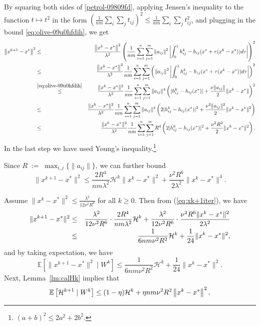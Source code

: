 \documentclass[10pt]{article}
\newcommand{\eqdef}{\; { := }\;}
\newcommand{\ExpBr}[1]{\mathbb{E}\left[#1\right]}
\newcommand{\norm}[1]{\left\|#1\right\|}
\newcommand{\cH}{{\mathcal{H}}}
\begin{document}
By squaring both sides of \eqref{petrol-09809fd},  applying Jensen's inequality to the function $t\mapsto t^2$ in the form $\left(\frac{1}{nm}\sum_i \sum_j t_{ij}\right)^2 \leq \frac{1}{nm}\sum_i \sum_j t^2_{ij}$, and plugging in the bound \eqref{eq:olive-09u0hfdih}, we get
\begin{eqnarray*}	
\norm{ x^{k+1} - x^* }^2	&\overset{}\leq &  \frac{ \norm{x^k - x^*}^2}{ \lambda^2} \left(\frac{1}{nm} \sum_{i=1}^n \sum_{j=1}^{m} \norm{a_{ij}}^2 \left|   \int_{0}^1 h_{ij}^k - h_{ij}(x^* + \tau(x^k - x^*))  d\tau  \right| \right)^2 \\
&\leq &\frac{ \norm{x^k - x^*}^2}{ \lambda^2} \frac{1}{nm} \sum_{i=1}^n \sum_{j=1}^{m} \left( \norm{a_{ij}}^2  \left| \int_{0}^1 h_{ij}^k - h_{ij}(x^* + \tau(x^k - x^*))  d\tau  \right|\right)^2 \\
&\overset{\eqref{eq:olive-09u0hfdih}}{\leq}&  \frac{\|x^k-x^*\|^2}{ \lambda^2} \frac{1}{nm}\sum_{i=1}^n \sum_{j=1}^{m} \|a_{ij}\|^4 \left(   |h_{ij}^k - h_{ij}(x^*)| + \frac{\nu \|a_{ij}\|}{2} \|x^k-x^*\|  \right)^2 \\ 
&\leq&  \frac{\|x^k-x^*\|^2}{ \lambda^2} \frac{1}{nm}\sum_{i=1}^n \sum_{j=1}^{m} \|a_{ij}\|^4 \left(   2|h_{ij}^k - h_{ij}(x^*)|^2 + \frac{\nu^2 \|a_{ij}\|^2}{2} \|x^k-x^*\|^2  \right) \\
&\leq & \frac{\|x^k-x^*\|^2}{ \lambda^2} \frac{1}{nm}\sum_{i=1}^n \sum_{j=1}^{m} R^4 \left(   2|h_{ij}^k - h_{ij}(x^*)|^2 + \frac{\nu^2 R^2}{2} \|x^k-x^*\|^2  \right).
\end{eqnarray*}
In the last step we have used Young's inequality.\footnote{$(a+b)^2 \leq 2a^2 + 2b^2$.}


Since $R\eqdef \max_{i, j} \{ \|a_{ij}\| \}$, we can further bound
\begin{equation}\label{eq:xk+1iter}
\|x^{k+1} - x^*\|^2 \leq \frac{2 R^4}{nm\lambda^2}  \cH^k \|x^k-x^*\|^2 + \frac{ \nu^2 R^6}{2\lambda^2}\|x^k-x^*\|^4. 
\end{equation}


Assume $\|x^k - x^*\|^2 \leq \frac{\lambda^2}{12\nu^2R^6}$ for all $k\geq 0$. Then from (\ref{eq:xk+1iter}), we have 
\begin{eqnarray*}
	\|x^{k+1} - x^*\|^2 &\leq& \frac{\lambda^2}{12\nu^2 R^6} \cdot \frac{2R^4}{nm\lambda^2} \cH^k + \frac{\lambda^2}{12\nu^2 R^6} \cdot \frac{ \nu^2 R^6\|x^k-x^*\|^2}{2\lambda^2} \\ 
	&\leq& \frac{1}{6nm \nu^2 R^2} {\cal H}^k + \frac{1}{24} \|x^k - x^*\|^2, 
\end{eqnarray*}
and by taking expectation, we have 
\begin{equation}\label{eq:expxk+1}
\ExpBr{ \|x^{k+1} - x^*\|^2 \;|\; W^k } \leq  \frac{1}{6nm \nu^2 R^2}  \cH^k + \frac{1}{24} \|x^k - x^*\|^2. 
\end{equation}
Next, Lemma~\ref{lm:calHk} implies that
\begin{equation}\label{eq:oklah090pop}
\ExpBr{ {\cal H}^{k+1} \;|\; W^k} \leq  (1-\eta) {\cal H}^k +  \eta nm \nu^2 R^2 \norm{x^k - x^*}^2.
\end{equation}
\end{document}
